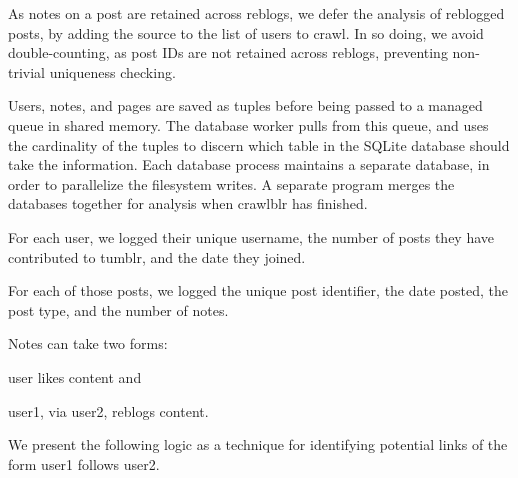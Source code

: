 As notes on a post are retained across reblogs, we defer the analysis 
of reblogged posts, by adding the source to the list of users to crawl.  
In so doing, we avoid double-counting, as post IDs are not retained 
across reblogs, preventing non-trivial uniqueness checking.

Users, notes, and pages are saved as tuples before being passed to a 
managed queue in shared memory.  The database worker pulls from this 
queue, and uses the cardinality of the tuples to discern which table 
in the SQLite database should take the information.  Each database 
process maintains a separate database, in order to parallelize the 
filesystem writes.  A separate program merges the databases together 
for analysis when crawlblr has finished.


For each user, we logged their unique username, the number of posts 
they have contributed to tumblr, and the date they joined. 

For each of those posts, we logged the unique post identifier, the 
date posted, the post type, and the number of notes.

Notes can take two forms: 

user likes content and 

user1, via user2, reblogs content.

We present the following logic as a technique for identifying potential 
links of the form user1 follows user2.


